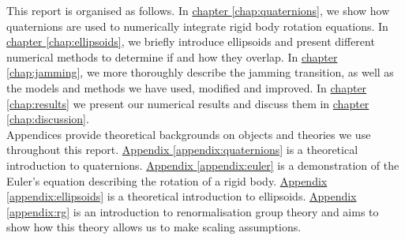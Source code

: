 \documentclass[class=report, float=false, crop=false]{standalone}
\begin{document}
This report is organised as follows. In \hyperref[chap:quaternions]{chapter \ref{chap:quaternions}}, we show how quaternions are used to numerically integrate rigid body rotation equations. In \hyperref[chap:ellipsoids]{chapter \ref{chap:ellipsoids}}, we briefly introduce ellipsoids and present different numerical methods to determine if and how they overlap. In \hyperref[chap:jamming]{chapter \ref{chap:jamming}}, we more thoroughly describe the jamming transition, as well as the models and methods we have used, modified and improved. In \hyperref[chap:results]{chapter \ref{chap:results}} we present our numerical results and discuss them in \hyperref[chap:discussion]{chapter \ref{chap:discussion}}.\\

Appendices provide theoretical backgrounds on objects and theories we use throughout this report. \hyperref[appendix:quaternions]{Appendix \ref{appendix:quaternions}} is a theoretical introduction to quaternions. \hyperref[appendix:euler]{Appendix \ref{appendix:euler}} is a demonstration of the Euler's equation describing the rotation of a rigid body. \hyperref[appendix:ellipsoids]{Appendix \ref{appendix:ellipsoids}} is a theoretical introduction to ellipsoids. \hyperref[appendix:rg]{Appendix \ref{appendix:rg}} is an introduction to renormalisation group theory and aims to show how this theory allows us to make scaling assumptions.

% 
\end{document}
